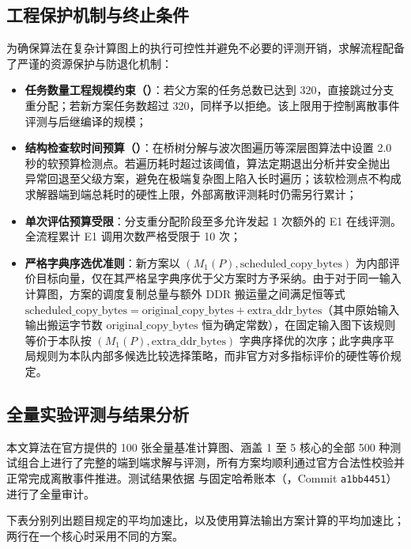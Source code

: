 \documentclass[anonymous,withtoc]{gmcm2026}
\providecommand{\tightlist}{\setlength{\itemsep}{0pt}\setlength{\parskip}{0pt}}
\begin{document}
\subsection{工程保护机制与终止条件}

为确保算法在复杂计算图上的执行可控性并避免不必要的评测开销，求解流程配备了严谨的资源保护与防退化机制：

\begin{itemize}
\tightlist
\item
  \textbf{任务数量工程规模约束（\texttt{}）}：若父方案的任务总数已达到 320，直接跳过分支重分配；若新方案任务数超过 320，同样予以拒绝。该上限用于控制离散事件评测与后继编译的规模；
\item
  \textbf{结构检查软时间预算（\texttt{}）}：在桥树分解与波次图遍历等深层图算法中设置 2.0 秒的软预算检测点。若遍历耗时超过该阈值，算法定期退出分析并安全抛出 \texttt{} 异常回退至父级方案，避免在极端复杂图上陷入长时遍历；该软检测点不构成求解器端到端总耗时的硬性上限，外部离散评测耗时仍需另行累计；
\item
  \textbf{单次评估预算受限}：分支重分配阶段至多允许发起 1 次额外的 E1 在线评测。全流程累计 E1 调用次数严格受限于 10 次；
\item
  \textbf{严格字典序选优准则}：新方案以 \((M_1(P), \text{scheduled\_copy\_bytes})\) 为内部评价目标向量，仅在其严格呈字典序优于父方案时方予采纳。由于对于同一输入计算图，方案的调度复制总量与额外 DDR 搬运量之间满足恒等式 \(\text{scheduled\_copy\_bytes} = \text{original\_copy\_bytes} + \text{extra\_ddr\_bytes}\)（其中原始输入输出搬运字节数 \(\text{original\_copy\_bytes}\) 恒为确定常数），在固定输入图下该规则等价于本队按 \((M_1(P), \text{extra\_ddr\_bytes})\) 字典序择优的次序；此字典序平局规则为本队内部多候选比较选择策略，而非官方对多指标评价的硬性等价规定。
\end{itemize}

\subsection{全量实验评测与结果分析}

本文算法在官方提供的 100 张全量基准计算图、涵盖 1 至 5 核心的全部 500 种测试组合上进行了完整的端到端求解与评测，所有方案均顺利通过官方合法性校验并正常完成离散事件推进。测试结果依据 \texttt{} 与固定哈希账本（\texttt{}，Commit \texttt{a1bb4451}）进行了全量审计。

下表分别列出题目规定的平均加速比，以及使用算法输出方案计算的平均加速比；两行在一个核心时采用不同的方案。
\end{document}
